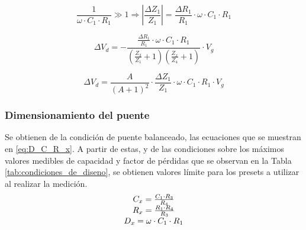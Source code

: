 \begin{equation}
    \frac{1}{\omega \cdot C_1 \cdot R_1 }\gg 1 \Rightarrow
    \left| \frac{\Delta Z_1}{Z_1} \right| = \frac{\Delta R_1}{R_1}\cdot\omega \cdot C_1 \cdot R_1 
\end{equation}

\begin{equation}
   \Delta V_d = - \frac{\frac{\Delta R_1}{R_1}\cdot\omega \cdot C_1 \cdot R_1 }{\left(\frac{Z_3}{Z_1}+ 1\right)\left(\frac{Z_x}{Z_4} + 1\right)} \cdot V_g
\end{equation}

\begin{equation}
   \Delta V_d = \frac{A}{(A+1)^2}\cdot \frac{\Delta Z_1}{Z_1}\cdot\omega \cdot C_1 \cdot R_1 \cdot V_g
\end{equation}

\subsubsection{Dimensionamiento del puente}
Se obtienen de la condici\'on de puente balanceado, las ecuaciones que se muestran en \ref{eq:D_C_R_x}. A partir de estas, y de las condiciones sobre los m\'aximos valores medibles de capacidad y factor de p\'erdidas que se observan en la Tabla \ref{tab:condiciones_de_diseno}, se obtienen valores l\'imite para los presets a utilizar al realizar la medici\'on.
\begin{equation}
    \centering
        \begin{array}{ccc}
            C_x = \frac{C_1\cdot R_3}{R_4}\\
            R_x = \frac{R_1 \cdot R_4}{R_3}\\
            D_x = \omega\cdot C_1 \cdot R_1
            
        \end{array} 
    \label{eq:D_C_R_x}
\end{equation}
\begin{table}[H]
\centering
{}
\caption{Condiciones de dise\~no del puente}
\label{tab:condiciones_de_diseno}
\end{table}

